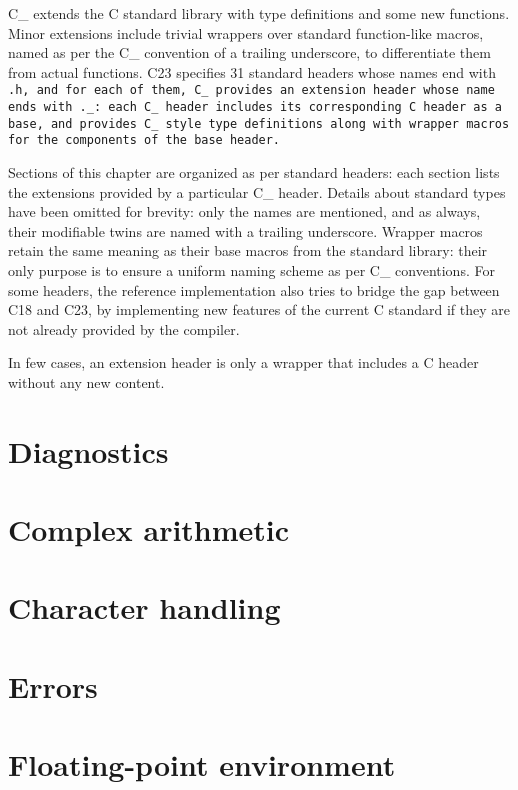 C\_ extends the C standard library with type definitions and some new functions.
Minor extensions include trivial wrappers over standard function-like macros,
named as per the C\_ convention of a trailing underscore,
to differentiate them from actual functions.
C23 specifies 31 standard headers whose names end with \tt{.h},
and for each of them, C\_ provides an extension header whose name
ends with \tt{._}: each C\_ header includes its corresponding C
header as a base, and provides C\_ style type definitions along
with wrapper macros for the components of the base header.

Sections of this chapter are organized as per standard headers:
each section lists the extensions provided by a particular C\_ header.
Details about standard types have been omitted for brevity:
only the names are mentioned, and as always,
their modifiable twins are named with a trailing underscore.
Wrapper macros retain the same meaning as their base
macros from the standard library: their only purpose is
to ensure a uniform naming scheme as per C\_ conventions.
For some headers, the reference implementation also tries to bridge
the gap between C18 and C23, by implementing new features of the
current C standard if they are not already provided by the compiler.

\note In few cases, an extension header is only a wrapper
that includes a C header without any new content.

\section{Diagnostics }


\section{Complex arithmetic }


\section{Character handling }


\section{Errors }


\section{Floating-point environment }


